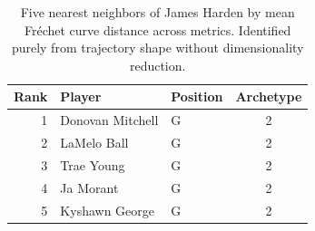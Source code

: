 \begin{table}[htbp]
  \centering\small
  \begin{tabular}{rllc}
    \toprule
    Rank & Player & Position & Archetype \\
    \midrule
    1 & Donovan Mitchell & G & 2 \\
    2 & LaMelo Ball & G & 2 \\
    3 & Trae Young & G & 2 \\
    4 & Ja Morant & G & 2 \\
    5 & Kyshawn George & G & 2 \\
    \bottomrule
  \end{tabular}
  \caption{Five nearest neighbors of James Harden by mean Fr\'{e}chet curve distance across metrics. Identified purely from trajectory shape without dimensionality reduction.}
  \label{tab:James_Harden_frechet_curve_neighbors}
\end{table}

